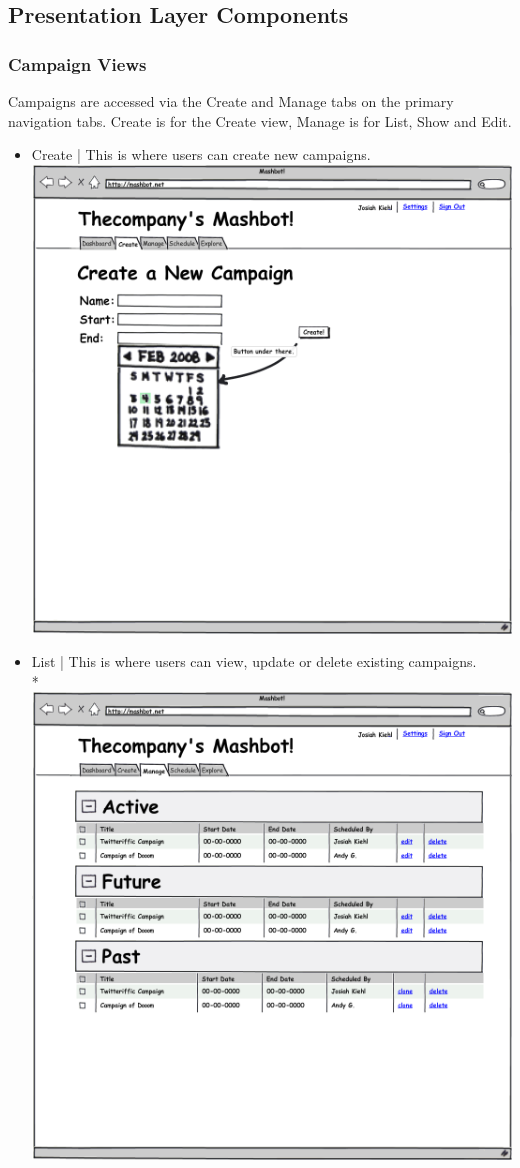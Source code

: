 \documentclass{article}
\begin{document}
\subsection{Presentation Layer Components}
\subsubsection{Campaign Views}
Campaigns are accessed via the Create and Manage tabs on the primary navigation tabs.  Create is for the Create view, Manage is for List, Show and Edit.
\begin{itemize}
\item Create | This is where users can create new campaigns.
  \includegraphics[width=\textwidth]{../mockups/create.png}
\item List | This is where users can view, update or delete existing campaigns. \\*
  \includegraphics[width=\textwidth]{../mockups/manage.png}

\end{itemize}
\end{document}
